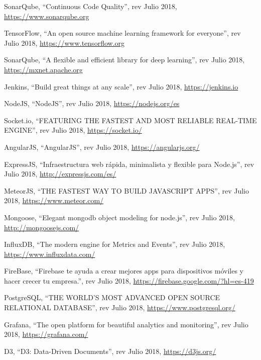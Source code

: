 \begin{thebibliography}{99}
 SonarQube, ``Continuous
Code Quality'', rev Julio 2018, \hyperref[sonarqube]{https://www.sonarqube.org}

 TensorFlow, ``An open source machine learning framework for everyone'', rev Julio 2018, \hyperref[tensor]{https://www.tensorflow.org}


 SonarQube, ``A flexible and efficient library for deep learning'', rev Julio 2018, \hyperref[mxnet]{https://mxnet.apache.org}

 Jenkins, ``Build great things at any scale'', rev Julio 2018, \hyperref[jenkins]{https://jenkins.io}

 NodeJS, ``NodeJS'', rev Julio 2018, \hyperref[nodejs]{https://nodejs.org/es}

 Socket.io, ``FEATURING THE FASTEST AND MOST RELIABLE REAL-TIME ENGINE'', rev Julio 2018, \hyperref[socket]{https://socket.io/}

 AngularJS, ``AngularJS'', rev Julio 2018, \hyperref[angularjs]{https://angularjs.org/}

 ExpressJS, ``Infraestructura web rápida, minimalista y flexible para Node.js'', rev Julio 2018, \hyperref[expressjs]{http://expressjs.com/es/}

 MeteorJS, ``THE FASTEST WAY TO BUILD JAVASCRIPT APPS'', rev Julio 2018, \hyperref[meteor]{https://www.meteor.com/}

 Mongoose, ``Elegant mongodb object modeling for node.js'', rev Julio 2018, \hyperref[mongoose]{http://mongoosejs.com/}

 InfluxDB, ``The modern engine for Metrics and Events'', rev Julio 2018, \hyperref[influxdb]{https://www.influxdata.com/}

 FireBase, ``Firebase te ayuda a crear mejores apps para dispositivos móviles y hacer crecer tu empresa.'', rev Julio 2018, \hyperref[firebase]{https://firebase.google.com/?hl=es-419}

 PostgreSQL, ``THE WORLD'S MOST ADVANCED OPEN SOURCE RELATIONAL DATABASE'', rev Julio 2018, \hyperref[prostgresql]{https://www.postgresql.org/}

 Grafana, ``The open platform for beautiful analytics and monitoring'', rev Julio 2018, \hyperref[grafana]{https://grafana.com/}

 D3, ``D3: Data-Driven Documents'', rev Julio 2018, \hyperref[d3]{https://d3js.org/}


\end{thebibliography}
